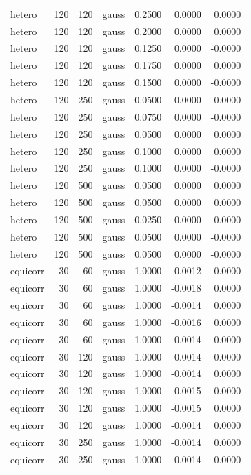 \begin{tabular}{lrrlrrr}
hetero & 120 & 120 & gauss & 0.2500 & 0.0000 & 0.0000 \\
hetero & 120 & 120 & gauss & 0.2000 & 0.0000 & 0.0000 \\
hetero & 120 & 120 & gauss & 0.1250 & 0.0000 & -0.0000 \\
hetero & 120 & 120 & gauss & 0.1750 & 0.0000 & 0.0000 \\
hetero & 120 & 120 & gauss & 0.1500 & 0.0000 & -0.0000 \\
hetero & 120 & 250 & gauss & 0.0500 & 0.0000 & -0.0000 \\
hetero & 120 & 250 & gauss & 0.0750 & 0.0000 & -0.0000 \\
hetero & 120 & 250 & gauss & 0.0500 & 0.0000 & 0.0000 \\
hetero & 120 & 250 & gauss & 0.1000 & 0.0000 & 0.0000 \\
hetero & 120 & 250 & gauss & 0.1000 & 0.0000 & -0.0000 \\
hetero & 120 & 500 & gauss & 0.0500 & 0.0000 & 0.0000 \\
hetero & 120 & 500 & gauss & 0.0500 & 0.0000 & 0.0000 \\
hetero & 120 & 500 & gauss & 0.0250 & 0.0000 & -0.0000 \\
hetero & 120 & 500 & gauss & 0.0500 & 0.0000 & -0.0000 \\
hetero & 120 & 500 & gauss & 0.0500 & 0.0000 & -0.0000 \\
equicorr & 30 & 60 & gauss & 1.0000 & -0.0012 & 0.0000 \\
equicorr & 30 & 60 & gauss & 1.0000 & -0.0018 & 0.0000 \\
equicorr & 30 & 60 & gauss & 1.0000 & -0.0014 & 0.0000 \\
equicorr & 30 & 60 & gauss & 1.0000 & -0.0016 & 0.0000 \\
equicorr & 30 & 60 & gauss & 1.0000 & -0.0014 & 0.0000 \\
equicorr & 30 & 120 & gauss & 1.0000 & -0.0014 & 0.0000 \\
equicorr & 30 & 120 & gauss & 1.0000 & -0.0014 & 0.0000 \\
equicorr & 30 & 120 & gauss & 1.0000 & -0.0015 & 0.0000 \\
equicorr & 30 & 120 & gauss & 1.0000 & -0.0015 & 0.0000 \\
equicorr & 30 & 120 & gauss & 1.0000 & -0.0014 & 0.0000 \\
equicorr & 30 & 250 & gauss & 1.0000 & -0.0014 & 0.0000 \\
equicorr & 30 & 250 & gauss & 1.0000 & -0.0014 & 0.0000 \\

\end{tabular}
